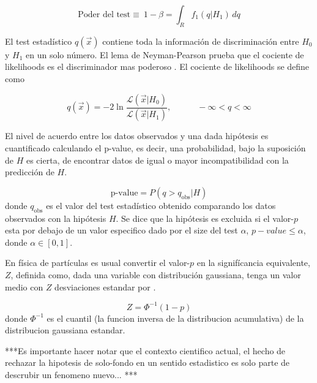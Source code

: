 \begin{equation}
  \text{Poder del test} \equiv\ 1-\beta = \int_R f_1(q|H_1)\, dq
\end{equation}

El test estadístico $q(\vec{x})$ contiene toda la información de discriminación entre $H_0$ y $H_1$
en un solo número. El lema de Neyman-Pearson prueba que el cociente de likelihoods es el
discriminador mas poderoso . El cociente de likelihoods se define como

\begin{equation}
  q(\vec{x}) = -2 \ln \frac{\mathcal{L}(\vec{x}|H_0)}{\mathcal{L}(\vec{x}|H_1)}, \quad \quad \quad  -\infty < q < \infty
\end{equation}


El nivel de acuerdo entre los datos observados y una dada hipótesis es cuantificado calculando
el p-value, es decir, una probabilidad, bajo la suposición de $H$ es cierta, de encontrar datos de
igual o mayor incompatibilidad con la predicción de $H$.

\begin{equation}
  \text{p-value} = P(q>q_\text{obs}|H)
\end{equation}
%
donde $q_\text{obs}$ es el valor del test estadístico obtenido comparando los datos observados con
la hipótesis $H$. Se dice que la hipótesis es excluida si el valor-$p$ esta por debajo de un valor
especifico dado por el size del test $\alpha$, $p-value \leq \alpha$, donde $\alpha \in [0,1]$.

En física de partículas es usual convertir el valor-$p$ en la signifícancia equivalente, $Z$,
definida como, dada una variable con distribución gaussiana, tenga un valor medio con $Z$
desviaciones estandar por .

\begin{equation}
  Z = \Phi^{-1}(1-p)
\end{equation}
%
donde $\Phi^{-1}$ es el cuantil (la funcion inversa de la distribucion acumulativa) de la distribucion
gaussiana estandar.

***Es importante hacer notar que el contexto cientifico actual, el hecho de rechazar la hipotesis de
solo-fondo en un sentido estadistico es solo parte de descrubir un fenomeno nuevo... ***


